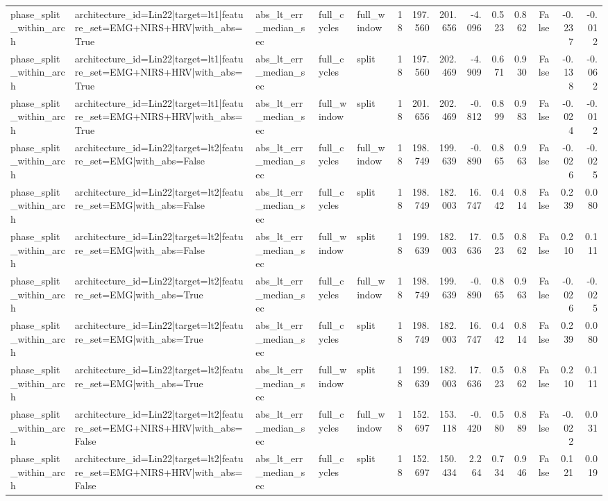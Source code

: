 \begin{table}
\begin{tabular}{lllllrrrrrrrrr}
phase_split_within_arch & architecture_id=Lin22|target=lt1|feature_set=EMG+NIRS+HRV|with_abs=True & abs_lt_err_median_sec & full_cycles & full_window & 18 & 197.560 & 201.656 & -4.096 & 0.523 & 0.862 & False & -0.237 & -0.012 \\
phase_split_within_arch & architecture_id=Lin22|target=lt1|feature_set=EMG+NIRS+HRV|with_abs=True & abs_lt_err_median_sec & full_cycles & split & 18 & 197.560 & 202.469 & -4.909 & 0.671 & 0.930 & False & -0.138 & -0.062 \\
phase_split_within_arch & architecture_id=Lin22|target=lt1|feature_set=EMG+NIRS+HRV|with_abs=True & abs_lt_err_median_sec & full_window & split & 18 & 201.656 & 202.469 & -0.812 & 0.899 & 0.983 & False & -0.024 & -0.012 \\
phase_split_within_arch & architecture_id=Lin22|target=lt2|feature_set=EMG|with_abs=False & abs_lt_err_median_sec & full_cycles & full_window & 18 & 198.749 & 199.639 & -0.890 & 0.865 & 0.963 & False & -0.026 & -0.025 \\
phase_split_within_arch & architecture_id=Lin22|target=lt2|feature_set=EMG|with_abs=False & abs_lt_err_median_sec & full_cycles & split & 18 & 198.749 & 182.003 & 16.747 & 0.442 & 0.814 & False & 0.239 & 0.080 \\
phase_split_within_arch & architecture_id=Lin22|target=lt2|feature_set=EMG|with_abs=False & abs_lt_err_median_sec & full_window & split & 18 & 199.639 & 182.003 & 17.636 & 0.523 & 0.862 & False & 0.210 & 0.111 \\
phase_split_within_arch & architecture_id=Lin22|target=lt2|feature_set=EMG|with_abs=True & abs_lt_err_median_sec & full_cycles & full_window & 18 & 198.749 & 199.639 & -0.890 & 0.865 & 0.963 & False & -0.026 & -0.025 \\
phase_split_within_arch & architecture_id=Lin22|target=lt2|feature_set=EMG|with_abs=True & abs_lt_err_median_sec & full_cycles & split & 18 & 198.749 & 182.003 & 16.747 & 0.442 & 0.814 & False & 0.239 & 0.080 \\
phase_split_within_arch & architecture_id=Lin22|target=lt2|feature_set=EMG|with_abs=True & abs_lt_err_median_sec & full_window & split & 18 & 199.639 & 182.003 & 17.636 & 0.523 & 0.862 & False & 0.210 & 0.111 \\
phase_split_within_arch & architecture_id=Lin22|target=lt2|feature_set=EMG+NIRS+HRV|with_abs=False & abs_lt_err_median_sec & full_cycles & full_window & 18 & 152.697 & 153.118 & -0.420 & 0.580 & 0.889 & False & -0.022 & 0.031 \\
phase_split_within_arch & architecture_id=Lin22|target=lt2|feature_set=EMG+NIRS+HRV|with_abs=False & abs_lt_err_median_sec & full_cycles & split & 18 & 152.697 & 150.434 & 2.264 & 0.734 & 0.946 & False & 0.121 & 0.019 \\

\end{tabular}
\end{table}
